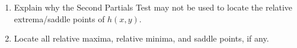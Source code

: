 \documentclass[12pt]{article}
\newif\ifans
\begin{document}
\begin{enumerate}
\begin{enumerate}

\item Explain why the Second Partials Test may not be used to locate the relative extrema/saddle points of $h(x,y)$.  

\ifans{\fbox{\parbox{1\linewidth}{$(0,0)$ is the only critical point of $h(x,y)$; but, the Second Partials Test does not apply because $h(x,y)$ does not have continuous second partial derivatives in any disk centered at this critical point.}}} \fi

\item Locate all relative maxima, relative minima, and saddle points, if any.

\ifans{\fbox{Relative minimum at $(0,0)$}} \fi

\end{enumerate}

\end{enumerate}

\end{document}
